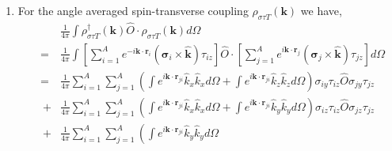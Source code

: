 \documentclass[12pt,letterpaper,UTF8]{report}
\begin{document}
{\begin{enumerate}
\begin{eqnarray}
&~+& \frac{1}{3} \sum_{i=1}^{A} \sum_{j=1}^{A}
\left[
j_0(k{r}_{ji})+j_2(k{r}_{ji})(\hat{r}_x^2+\hat{r}_z^2-2\hat{r}_y^2)
\right]
\sigma_{iy} \tau_{iz} \hat{O} \sigma_{jy} \tau_{jz} \nonumber \\
&~+& \frac{1}{3} \sum_{i=1}^{A} \sum_{j=1}^{A}
\left[
j_0(k{r}_{ji})+j_2(k{r}_{ji})(\hat{r}_x^2+\hat{r}_y^2-2\hat{r}_z^2)
\right]
\sigma_{iz} \tau_{iz} \hat{O} \sigma_{jz} \tau_{jz} \nonumber \\
&~-& \sum_{i=1}^{A} \sum_{j=1}^{A} j_2(k{r}_{ji})\hat{r}_x\hat{r}_y
\left(\sigma_{iy} \tau_{iz} \hat{O} \sigma_{jx} \tau_{jz} + \sigma_{ix} \tau_{iz} \hat{O} \sigma_{jy} \tau_{jz}  \right)\nonumber \\
&~-& \sum_{i=1}^{A} \sum_{j=1}^{A} j_2(k{r}_{ji})\hat{r}_x\hat{r}_z
\left(\sigma_{iz} \tau_{iz} \hat{O} \sigma_{jx} \tau_{jz} + \sigma_{ix} \tau_{iz} \hat{O} \sigma_{jz} \tau_{jz} \right) \nonumber \\
&~-& \sum_{i=1}^{A} \sum_{j=1}^{A} j_2(k{r}_{ji})\hat{r}_y\hat{r}_z
\left( \sigma_{iz} \tau_{iz} \hat{O} \sigma_{jy} \tau_{jz} + \sigma_{iy} \tau_{iz} \hat{O} \sigma_{jz} \tau_{jz} \right).
\end{eqnarray}
  \item For the angle averaged spin-transverse coupling $\rho_{\sigma \tau T} (\bm{k})$ we have,
\begin{eqnarray}
&&
\frac{1}{4\pi} \int \rho_{\sigma \tau T}^\dagger(\bm{k}) \hat{O} \cdot \rho_{\sigma \tau T}(\bm{k})  d \Omega \nonumber \\
&=&
\frac{1}{4\pi}
 \int  \left[\sum_{i=1}^{A} e^{-i \bm{k} \cdot \bm{r}_i } (\bm{\sigma}_i \times \hat{\bm{k}}) \tau_{iz} \right]
\hat{O} \cdot
\left[\sum_{j=1}^{A} e^{i \bm{k} \cdot \bm{r}_j } (\bm{\sigma}_j \times \hat{\bm{k}}) \tau_{jz}  \right]  d \Omega  \nonumber \\
&=& \frac{1}{4\pi} \sum_{i=1}^{A} \sum_{j=1}^{A}
\left( \int e^{i \bm{k} \cdot \bm{r}_{ji} } \hat{k}_x \hat{k}_x d \Omega
+\int e^{i \bm{k} \cdot \bm{r}_{ji} } \hat{k}_z \hat{k}_z d \Omega
\right)
\sigma_{iy} \tau_{iz} \hat{O} \sigma_{jy} \tau_{jz}\nonumber \\
&~+& \frac{1}{4\pi} \sum_{i=1}^{A} \sum_{j=1}^{A}
\left( \int e^{i \bm{k} \cdot \bm{r}_{ji} } \hat{k}_x \hat{k}_x d \Omega
+\int e^{i \bm{k} \cdot \bm{r}_{ji} } \hat{k}_y \hat{k}_y d \Omega
\right)
\sigma_{iz} \tau_{iz} \hat{O} \sigma_{jz} \tau_{jz}\nonumber \\
&~+& \frac{1}{4\pi} \sum_{i=1}^{A} \sum_{j=1}^{A}
\left( \int e^{i \bm{k} \cdot \bm{r}_{ji} } \hat{k}_y \hat{k}_y d \Omega

\end{eqnarray}
\end{enumerate}}
\end{document}
